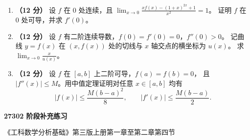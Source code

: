 \documentclass[UTF8,a4paper,zihao=-4,fontset=fandol]{ctexart}
\begin{document}
\begin{enumerate}[start=20]
\item \textbf{（12 分）} 设 $f$ 在 $0$ 处连续，且
$\displaystyle\lim_{x\to0}\frac{xf(x)-(1+x)^{2x}+1}{x^2}=1$。
证明 $f$ 在 $0$ 处可导，并求 $f'(0)$。
\vspace{5.5cm}
\item \textbf{（12 分）} 设 $f$ 有二阶连续导数，$f(0)=f'(0)=0$，$f''(0)>0$。
记曲线 $y=f(x)$ 在 $(x,f(x))$ 处的切线与 $x$ 轴交点的横坐标为 $u(x)$。
求 $\displaystyle\lim_{x\to0}\frac{x}{u(x)}$。
\vspace{5.5cm}
\item \textbf{（12 分）} 设 $f$ 在 $[a,b]$ 上二阶可导，$f(a)=f(b)=0$，
且 $|f''(x)|\le M$。用中值定理证明对任意 $x\in[a,b]$ 均有
\[
  |f(x)|\le\frac{M(b-a)^2}{8},\qquad |f'(x)|\le\frac{M(b-a)}2 .
\]
\end{enumerate}

\newpage
{}
\begin{center}
  {\LARGE\bfseries 27302 阶段补充练习\par}
  \small 《工科数学分析基础》第三版上册第一章至第二章第四节
\end{center}
\end{document}
